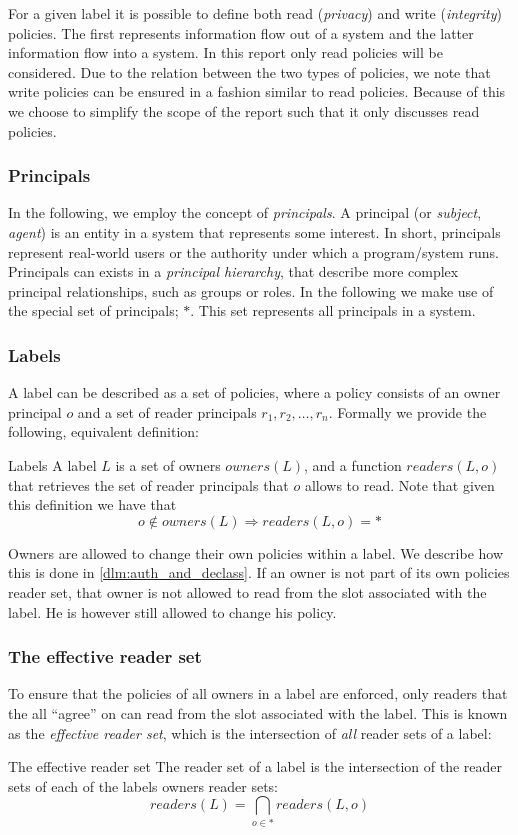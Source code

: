 For a given label it is possible to define both read (\emph{privacy}) and write (\emph{integrity}) policies.
The first represents information flow out of a system and the latter information flow into a system.
In this report only read policies will be considered.
Due to the relation between the two types of policies, we note that write policies can be ensured in a fashion similar to read policies.
Because of this we choose to simplify the scope of the report such that it only discusses read policies.

\subsubsection{Principals}
In the following, we employ the concept of \emph{principals}.
A principal (or \emph{subject}, \emph{agent}) is an entity in a system that represents some interest.
In short, principals represent real-world users or the authority under which a program/system runs.
Principals can exists in a \emph{principal hierarchy}, that describe more complex principal relationships, such as groups or roles.
In the following we make use of the special set of principals; $*$.
This set represents all principals in a system.

\subsubsection{Labels}
A label can be described as a set of policies, where a policy consists of an owner principal $o$ and a set of reader principals $r_1, r_2, \dots, r_n$.
Formally we provide the following, equivalent definition:
\begin{definition}{Labels}
A label $L$ is a set of owners $owners(L)$, and a function $readers(L, o)$ that retrieves the set of reader principals that $o$ allows to read.
Note that given this definition we have that $$o \notin owners(L) \Rightarrow readers(L, o) = *$$
\end{definition}

Owners are allowed to change their own policies within a label.
We describe how this is done in \cref{dlm:auth_and_declass}.
If an owner is not part of its own policies reader set, that owner is not allowed to read from the slot associated with the label.
He is however still allowed to change his policy.

\subsubsection{The effective reader set}
To ensure that the policies of all owners in a label are enforced, only readers that the all ``agree'' on can read from the slot associated with the label.
This is known as the \emph{effective reader set}, which is the intersection of \emph{all} reader sets of a label:
\begin{definition}{The effective reader set}
  The reader set of a label is the intersection of the reader sets of each of the labels owners reader sets:
  $$readers(L) = \bigcap_{o \in *} readers(L, o)$$
\end{definition}

